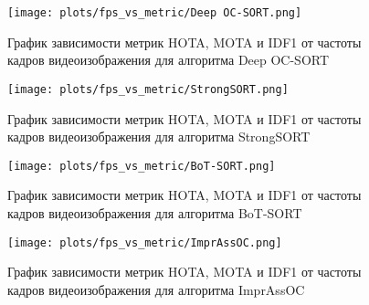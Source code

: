 \begin{figure}[ht]
    \centering
    \texttt{[image: plots/fps\_vs\_metric/Deep OC-SORT.png]}
    \caption{График зависимости метрик HOTA, MOTA и IDF1 от частоты кадров видеоизображения для алгоритма Deep OC-SORT}
    \label{fig:fps_Deep OC-SORT}
\end{figure}

\begin{figure}[ht]
    \centering
    \texttt{[image: plots/fps\_vs\_metric/StrongSORT.png]}
    \caption{График зависимости метрик HOTA, MOTA и IDF1 от частоты кадров видеоизображения для алгоритма StrongSORT}
    \label{fig:fps_StrongSORT}
\end{figure}

\begin{figure}[ht]
    \centering
    \texttt{[image: plots/fps\_vs\_metric/BoT-SORT.png]}
    \caption{График зависимости метрик HOTA, MOTA и IDF1 от частоты кадров видеоизображения для алгоритма BoT-SORT}
    \label{fig:fps_BoT-SORT}
\end{figure}

\begin{figure}[ht]
    \centering
    \texttt{[image: plots/fps\_vs\_metric/ImprAssOC.png]}
    \caption{График зависимости метрик HOTA, MOTA и IDF1 от частоты кадров видеоизображения для алгоритма ImprAssOC}
    \label{fig:fps_ImprAssOC}
\end{figure}
\FloatBarrier